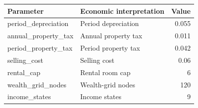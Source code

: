 \begingroup\small
\setlength{\tabcolsep}{3pt}
\renewcommand{\arraystretch}{1.04}
\begin{tabularx}{\linewidth}{XXr}
\toprule
Parameter & Economic interpretation & Value \\
\midrule
period\allowbreak\_depreciation & Period depreciation & 0.055 \\
annual\allowbreak\_property\allowbreak\_tax & Annual property tax & 0.011 \\
period\allowbreak\_property\allowbreak\_tax & Period property tax & 0.042 \\
selling\allowbreak\_cost & Selling cost & 0.06 \\
rental\allowbreak\_cap & Rental room cap & 6 \\
wealth\allowbreak\_grid\allowbreak\_nodes & Wealth-grid nodes & 120 \\
income\allowbreak\_states & Income states & 9 \\
\bottomrule
\end{tabularx}
\endgroup

